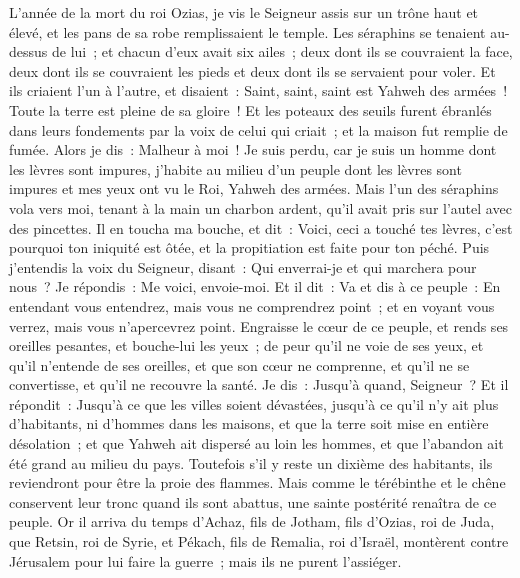 \begin{multicols}{2}
\VerseOne{}L'année de la mort du roi Ozias, je vis le Seigneur assis sur un trône haut et élevé, et les pans de sa robe remplissaient le temple.
Les séraphins se tenaient au-dessus de lui~; et chacun d'eux avait six ailes~; deux dont ils se couvraient la face, deux dont ils se couvraient les pieds et deux dont ils se servaient pour voler.
Et ils criaient l'un à l'autre, et disaient~: Saint, saint, saint est Yahweh des armées~! Toute la terre est pleine de sa gloire~!
Et les poteaux des seuils furent ébranlés dans leurs fondements par la voix de celui qui criait~; et la maison fut remplie de fumée.
Alors je dis~: Malheur à moi~! Je suis perdu, car je suis un homme dont les lèvres sont impures, j'habite au milieu d'un peuple dont les lèvres sont impures et mes yeux ont vu le Roi, Yahweh des armées.
Mais l'un des séraphins vola vers moi, tenant à la main un charbon ardent, qu'il avait pris sur l'autel avec des pincettes.
Il en toucha ma bouche, et dit~: Voici, ceci a touché tes lèvres, c'est pourquoi ton iniquité est ôtée, et la propitiation est faite pour ton péché.
Puis j'entendis la voix du Seigneur, disant~: Qui enverrai-je et qui marchera pour nous~? Je répondis~: Me voici, envoie-moi.
Et il dit~: Va et dis à ce peuple~: En entendant vous entendrez, mais vous ne comprendrez point~; et en voyant vous verrez, mais vous n'apercevrez point.
Engraisse le cœur de ce peuple, et rends ses oreilles pesantes, et bouche-lui les yeux~; de peur qu'il ne voie de ses yeux, et qu'il n'entende de ses oreilles, et que son cœur ne comprenne, et qu'il ne se convertisse, et qu'il ne recouvre la santé.
Je dis~: Jusqu'à quand, Seigneur~? Et il répondit~: Jusqu'à ce que les villes soient dévastées, jusqu'à ce qu'il n'y ait plus d'habitants, ni d'hommes dans les maisons, et que la terre soit mise en entière désolation~;
 et que Yahweh ait dispersé au loin les hommes, et que l'abandon ait été grand au milieu du pays.
Toutefois s'il y reste un dixième des habitants, ils reviendront pour être la proie des flammes. Mais comme le térébinthe et le chêne conservent leur tronc quand ils sont abattus, une sainte postérité renaîtra de ce peuple.
\VerseOne{}Or il arriva du temps d'Achaz, fils de Jotham, fils d'Ozias, roi de Juda, que Retsin, roi de Syrie, et Pékach, fils de Remalia, roi d'Israël, montèrent contre Jérusalem pour lui faire la guerre~; mais ils ne purent l'assiéger.

\end{multicols}
